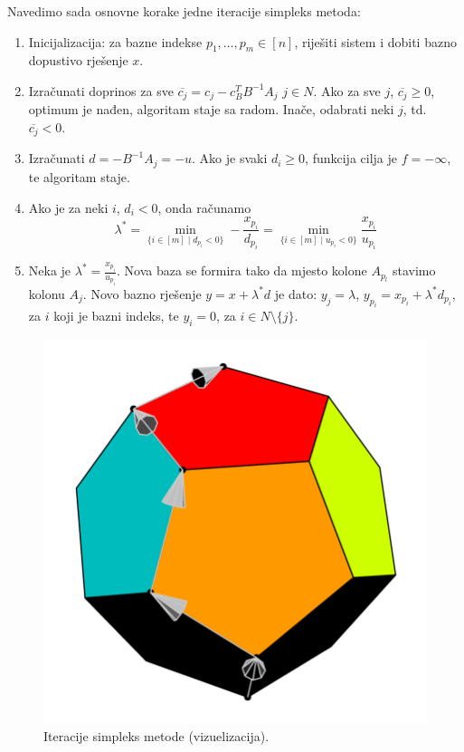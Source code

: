 \documentclass[a4paper, utf8, 11pt, colorlinks]{article}
\begin{document}
Navedimo sada osnovne korake jedne iteracije simpleks metoda:
\begin{enumerate}
    \item Inicijalizacija: za bazne indekse $p_1,\ldots,p_m \in [n]$, riješiti sistem i dobiti bazno dopustivo rješenje $x$. 
    \item Izračunati doprinos za sve $\overline{c_j} = c_j - c_B^T B^{-1}A_j $
          $j \in N$. Ako za sve $j$, $\overline{c_j} \geq 0$, optimum je nađen, algoritam staje sa radom. Inače, odabrati neki $j$, td. $\overline{c_j}<0$.
    \item Izračunati $d = -B^{-1}A_j = -u$. Ako je svaki $d_i \geq  0$, funkcija cilja je $f = - \infty$, te algoritam staje. 
    \item Ako je za neki $i$, $d_i < 0$, onda računamo 
             $$ \lambda^* = \min_{ \{i\in [m] \mid d_{p_i} < 0  \}} - \frac{x_{p_i}}{d_{p_i}} =  \min_{ \{i\in [m] \mid u_{p_i} < 0  \}} \frac{x_{p_i}}{u_{p_i}} $$
    \item Neka je $\lambda^* = \frac{x_{p_i}}{u_{p_i}}$. Nova baza se formira tako da mjesto kolone $A_{p_l}$ stavimo kolonu $A_j$. Novo bazno rješenje 
    $y = x + \lambda^*d $ je dato: $y_j = \lambda$, $y_{p_i} = x_{p_i} + \lambda^* d_{p_i}$, za $i$ koji je bazni indeks, te $y_i = 0$, za $i \in N \setminus \{j\}$. 
\end{enumerate}

\begin{figure}[!ht]
	\centering
   \includegraphics[scale=0.25]{moving_simplex.png}
    \caption{Iteracije simpleks metode (vizuelizacija).}
    \label{fig:simpleks-visuelisation}
\end{figure}
\end{document}
